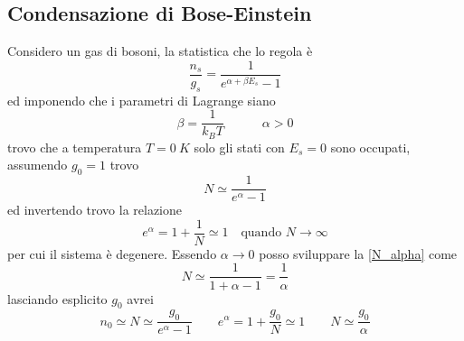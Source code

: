 

\subsection{Condensazione di Bose-Einstein}
Considero un gas di bosoni, la statistica che lo regola è 
\begin{equation}
\frac{n_s}{g_s} = \frac{1}{e^{ \alpha + \beta E_s } - 1}
\end{equation}
ed imponendo che i parametri di Lagrange siano
\begin{equation}
\beta = \frac{1}{k_B T} \quad\quad\quad \alpha > 0
\end{equation}
trovo che a temperatura $T = \SI{0}{K}$ solo gli stati con $E_s = 0$ sono occupati, assumendo $g_0  = 1$ trovo
\begin{equation}
N \simeq \frac{ 1}{e^{ \alpha } - 1 }
\label{N_alpha}
\end{equation}
ed invertendo trovo la relazione
\begin{equation}
e^{\alpha} = 1 + \frac{1}{N} \simeq 1 \quad \mbox{quando } N \to \infty
\end{equation}
per cui il sistema è degenere.
Essendo $\alpha \to 0$ posso sviluppare la \ref{N_alpha} come
\begin{equation}
N \simeq \frac{1}{1+ \alpha - 1} = \frac{1}{\alpha}
\end{equation}
lasciando esplicito $g_0$ avrei
\begin{equation}
n_0 \simeq N \simeq \frac{g_0}{e^{ \alpha } - 1 }
\quad\quad
e^{\alpha} = 1 + \frac{g_0}{N} \simeq 1
\quad\quad
N \simeq \frac{g_0}{\alpha}
\end{equation}

